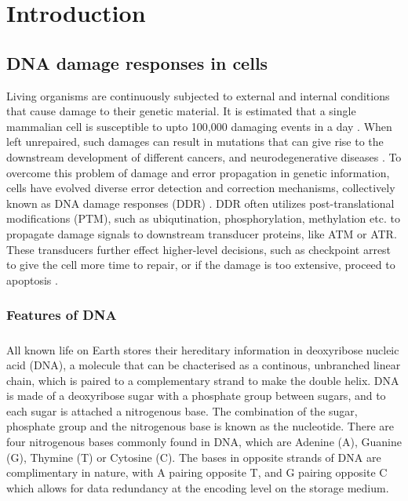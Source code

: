 \chapter{Introduction}
\section{DNA damage responses in cells}
Living organisms are continuously subjected to external and internal conditions that cause damage to their genetic material. It is estimated that a single mammalian cell is susceptible to upto 100,000 damaging events in a day \cite{ciccia2010dna}. When left unrepaired, such damages can result in mutations that can give rise to the downstream development of different cancers, and neurodegenerative diseases \cite{friedberg2005dna}. To overcome this problem of damage and error propagation in genetic information, cells have evolved diverse error detection and correction mechanisms, collectively known as DNA damage responses (DDR) \cite{hoeijmakers2009dna}. DDR often utilizes post-translational modifications (PTM), such as ubiqutination, phosphorylation, methylation etc. to propagate damage signals to downstream transducer proteins, like ATM or ATR. These transducers further effect higher-level decisions, such as checkpoint arrest to give the cell more time to repair, or if the damage is too extensive, proceed to apoptosis \cite{derks2014dna}.

\subsection{Features of DNA}
\paragraph*{} All known life on Earth stores their hereditary information in deoxyribose nucleic acid (DNA), a molecule that can be chacterised as a continous, unbranched linear chain, which is paired to a complementary strand to make the double helix. DNA is made of a deoxyribose sugar with a phosphate group between sugars, and to each sugar is attached a nitrogenous base. The combination of the sugar, phosphate group and the nitrogenous base is known as the nucleotide. There are four nitrogenous bases commonly found in DNA, which are Adenine (A), Guanine (G), Thymine (T) or Cytosine (C). The bases in opposite strands of DNA are complimentary in nature, with A pairing opposite T, and G pairing opposite C which allows for data redundancy at the encoding level on the storage medium. 

